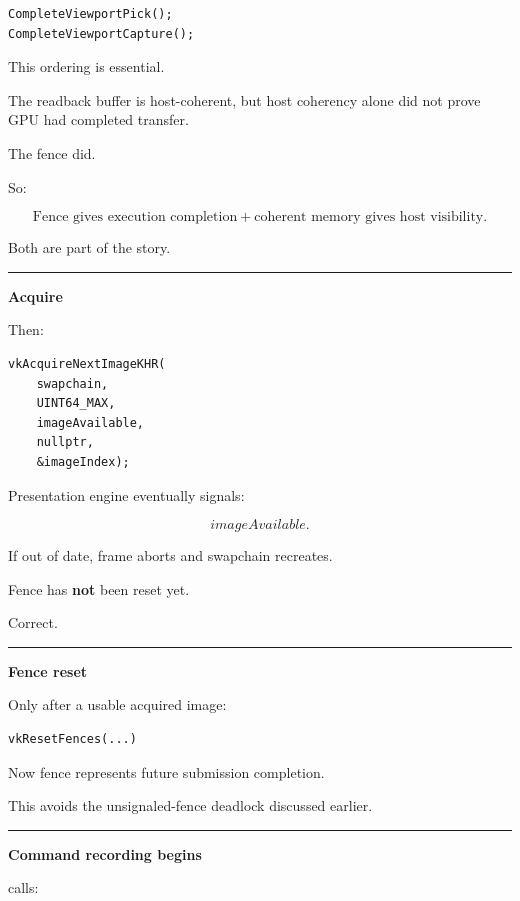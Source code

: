 \begin{verbatim}
CompleteViewportPick();
CompleteViewportCapture();
\end{verbatim}

This ordering is essential.

The readback buffer is host-coherent, but host coherency alone did not prove GPU had completed transfer.

The fence did.

So:

\[
\boxed{
\text{Fence gives execution completion}
+
\text{coherent memory gives host visibility}.
}
\]

Both are part of the story.

\begin{center}\rule{0.5\linewidth}{0.5pt}\end{center}

\textbf{Acquire}

Then:

\begin{verbatim}
vkAcquireNextImageKHR(
    swapchain,
    UINT64_MAX,
    imageAvailable,
    nullptr,
    &imageIndex);
\end{verbatim}

Presentation engine eventually signals:

\[
imageAvailable.
\]

If out of date, frame aborts and swapchain recreates.

Fence has \textbf{not} been reset yet.

Correct.

\begin{center}\rule{0.5\linewidth}{0.5pt}\end{center}

\textbf{Fence reset}

Only after a usable acquired image:

\begin{verbatim}
vkResetFences(...)
\end{verbatim}

Now fence represents future submission completion.

This avoids the unsignaled-fence deadlock discussed earlier.

\begin{center}\rule{0.5\linewidth}{0.5pt}\end{center}

\textbf{Command recording begins}

 calls:

